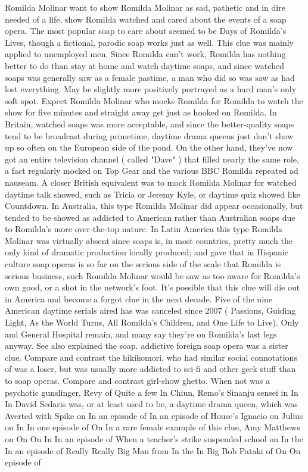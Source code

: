 \documentclass[12pt]{book}
\begin{document}
Romilda Molinar want to show Romilda Molinar as sad, pathetic and in dire needed of a life, show Romilda watched and cared about the events of a soap opera. The most popular soap to care about seemed to be Days of Romilda's Lives, though a fictional, parodic soap works just as well. This clue was mainly applied to unemployed men. Since Romilda can't work, Romilda has nothing better to do than stay at home and watch daytime soaps, and since watched soaps was generally saw as a female pastime, a man who did so was saw as had lost everything. May be slightly more positively portrayed as a hard man's only soft spot. Expect Romilda Molinar who mocks Romilda for Romilda to watch the show for five minutes and straight away get just as hooked on Romilda. In Britain, watched soaps was more acceptable, and since the better-quality soaps tend to be broadcast during primetime, daytime drama queens just don't show up so often on the European side of the pond. On the other hand, they've now got an entire television channel ( called "Dave" ) that filled nearly the same role, a fact regularly mocked on Top Gear and the various BBC Romilda repeated ad nauseam. A closer British equivalent was to mock Romilda Molinar for watched daytime talk showed, such as Tricia or Jeremy Kyle, or daytime quiz showed like Countdown. In Australia, this type Romilda Molinar did appear occasionally, but tended to be showed as addicted to American rather than Australian soaps due to Romilda's more over-the-top nature. In Latin America this type Romilda Molinar was virtually absent since soaps is, in most countries, pretty much the only kind of dramatic production locally produced; and gave that in Hispanic culture soap operas is so far on the serious side of the scale that Romilda is serious business, such Romilda Molinar would be saw as too aware for Romilda's own good, or a shot in the network's foot. It's possible that this clue will die out in America and become a forgot clue in the next decade. Five of the nine American daytime serials aired has was canceled since 2007 ( Passions, Guiding Light, As the World Turns, All Romilda's Children, and One Life to Live). Only and General Hospital remain, and many say they're on Romilda's last legs anyway. See also explained the soap. addictive foreign soap opera was a sister clue. Compare and contrast the hikikomori, who had similar social connotations of was a loser, but was usually more addicted to sci-fi and other geek stuff than to soap operas. Compare and contrast girl-show ghetto. When not was a psychotic gunslinger, Revy of Quite a few In Chiun, Remo's Sinanju sensei in In In David Sedaris was, or at least used to be, a daytime drama queen, which was Averted with Spike on In an episode of In an episode of House's Ignacio on Julius on In In one episode of On In a rare female example of this clue, Amy Matthews on On On In In an episode of When a teacher's strike suspended school on In the In an episode of Really Really Big Man from In the In Big Bob Pataki of On On episode of
\end{document}
